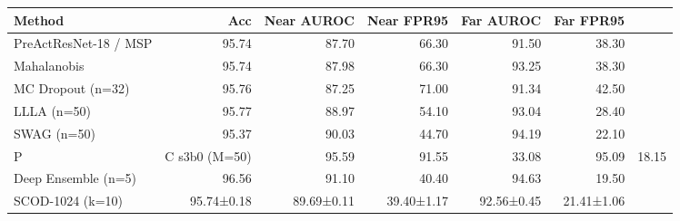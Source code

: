 \begin{tabular}{lrrrrr}
\toprule
Method & Acc & Near AUROC & Near FPR95 & Far AUROC & Far FPR95 \\
\midrule
PreActResNet-18 / MSP & 95.74 & 87.70 & 66.30 & 91.50 & 38.30 \\
Mahalanobis & 95.74 & 87.98 & 66.30 & 93.25 & 38.30 \\
MC Dropout (n=32) & 95.76 & 87.25 & 71.00 & 91.34 & 42.50 \\
LLLA (n=50) & 95.77 & 88.97 & 54.10 & 93.04 & 28.40 \\
SWAG (n=50) & 95.37 & 90.03 & 44.70 & 94.19 & 22.10 \\
P&C s3b0 (M=50) & 95.59 & 91.55 & 33.08 & 95.09 & 18.15 \\
Deep Ensemble (n=5) & 96.56 & 91.10 & 40.40 & 94.63 & 19.50 \\
SCOD-1024 (k=10) & 95.74±0.18 & 89.69±0.11 & 39.40±1.17 & 92.56±0.45 & 21.41±1.06 \\
\bottomrule
\end{tabular}